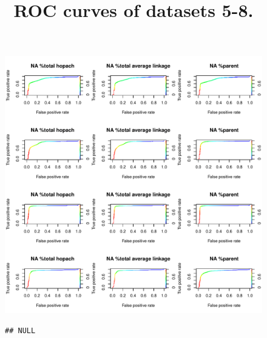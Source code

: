 \documentclass[11pt,a4paper,twoside]{report}\usepackage[]{graphicx}\usepackage[]{color}
\makeatletter
\def\maxwidth{ %
  \ifdim\Gin@nat@width>\linewidth
    \linewidth
  \else
    \Gin@nat@width
  \fi
}
\newenvironment{kframe}{%
 \def\at@end@of@kframe{}%
 \ifinner\ifhmode%
  \def\at@end@of@kframe{\end{minipage}}%
  \begin{minipage}{\columnwidth}%
 \fi\fi%
 \def\FrameCommand##1{\hskip\@totalleftmargin \hskip-\fboxsep
 \colorbox{shadecolor}{##1}\hskip-\fboxsep
     \hskip-\linewidth \hskip-\@totalleftmargin \hskip\columnwidth}%
 \MakeFramed {\advance\hsize-\width
   \@totalleftmargin\z@ \linewidth\hsize
   \@setminipage}}%
 {\par\unskip\endMakeFramed%
 \at@end@of@kframe}
\newenvironment{knitrout}{}{} %
\makeatother
\begin{document}
\begin{figure}
\begin{knitrout}
\includegraphics[width=\maxwidth]{figure/unnamed-chunk-2-3} 
\begin{kframe}\begin{verbatim}
## NULL
\end{verbatim}
\end{kframe}
\end{knitrout}
\title{ROC curves of datasets 5-8.\label{fig:2}}
\end{figure}
\end{document}

